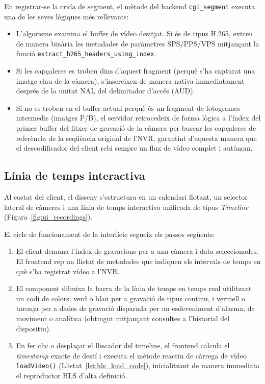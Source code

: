 En registrar-se la crida de segment, el mètode del backend \texttt{cgi\_segment} executa una de les seves lògiques més rellevants:
\begin{itemize}
  \item L'algorisme examina el buffer de vídeo desitjat. Si és de tipus H.265, extreu de manera binària les metadades de paràmetres SPS/PPS/VPS mitjançant la funció \texttt{extract\_h265\_headers\_using\_index}.
  \item Si les capçaleres es troben dins d'aquest fragment (perquè s'ha capturat una imatge clau de la càmera), s'insereixen de manera nativa immediatament després de la unitat NAL del delimitador d'accés (AUD).
  \item Si no es troben en el buffer actual perquè és un fragment de fotogrames intermedis (imatges P/B), el servidor retrocedeix de forma lògica a l'índex del primer buffer del fitxer de gravació de la càmera per buscar les capçaleres de referència de la seqüència original de l'NVR, garantint d'aquesta manera que el descodificador del client rebi sempre un flux de vídeo complet i autònom.
\end{itemize}

\subsection{Línia de temps interactiva}
Al costat del client, el disseny s'estructura en un calendari flotant, un selector lateral de càmeres i una línia de temps interactiva unificada de tipus \textit{Timeline} (Figura~\ref{fig:ui_recordings}).

El cicle de funcionament de la interfície segueix els passos següents:
\begin{enumerate}
  \item El client demana l'índex de gravacions per a una càmera i data seleccionades. El frontend rep un llistat de metadades que indiquen els intervals de temps en què s'ha registrat vídeo a l'NVR.
  \item El component dibuixa la barra de la línia de temps en temps real utilitzant un codi de colors: verd o blau per a gravació de tipus continu, i vermell o taronja per a dades de gravació disparada per un esdeveniment d'alarma, de moviment o analítica (obtingut mitjançant consultes a l'historial del dispositiu).
  \item En fer clic o desplaçar el lliscador del timeline, el frontend calcula el \textit{timestamp} exacte de destí i executa el mètode reactiu de càrrega de vídeo \texttt{loadVideo()} (Llistat~\ref{lst:hls_load_code}), inicialitzant de manera immediata el reproductor HLS d'alta definició.
\end{enumerate}

